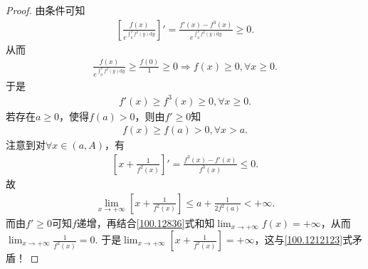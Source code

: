 \documentclass[../../main.tex]{subfiles}%
\begin{document}
\begin{proof}

由条件可知
\begin{align*}
\left[ \frac{f\left( x \right)}{e^{\int_0^x{f^2\left( y \right) \mathrm{d}y}}} \right]' =\frac{f' \left( x \right) -f^3\left( x \right)}{e^{\int_0^x{f^2\left( y \right) \mathrm{d}y}}}\geqslant 0.
\end{align*}
从而
\begin{align*}
\frac{f\left( x \right)}{e^{\int_0^x{f^2\left( y \right) \mathrm{d}y}}}\geqslant \frac{f\left( 0 \right)}{1}\geqslant 0\Longrightarrow f\left( x \right) \geqslant 0,\forall x\geqslant 0.
\end{align*}
于是
\begin{align*}
f' \left( x \right) \geqslant f^3\left( x \right) \geqslant 0,\forall x\geqslant 0.
\end{align*}
若存在$a\geqslant 0$，使得$f\left( a \right) >0$，则由$f' \geqslant 0$知
\begin{align}
f\left( x \right) \geqslant f\left( a \right) >0,\forall x>a. \label{100.12836}
\end{align}
注意到对$\forall x\in \left( a,A \right)$，有
\begin{align*}
\left[ x+\frac{1}{f^2\left( x \right)} \right]' =\frac{f^3\left( x \right) -f' \left( x \right)}{f^3\left( x \right)}\leqslant 0.
\end{align*}
故
\begin{align}
\lim_{x\rightarrow +\infty}\left[ x+\frac{1}{f^2\left( x \right)} \right] \leqslant a+\frac{1}{2f^2\left( a \right)}<+\infty . \label{100.1212123}
\end{align}
而由$f' \geqslant 0$可知$f$递增，再结合\eqref{100.12836}式和知$\lim_{x\rightarrow +\infty} f\left( x \right) =+\infty $，从而$\lim_{x\rightarrow +\infty}\frac{1}{f^2\left( x \right)}=0 .$
于是$\lim_{x\rightarrow +\infty}\left[ x+\frac{1}{f^2\left( x \right)} \right] =+\infty$，这与\eqref{100.1212123}式矛盾！

\end{proof}
\end{document}

